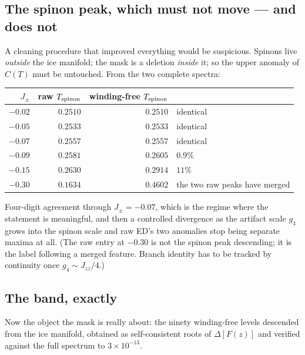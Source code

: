 \documentclass[11pt,a4paper]{article}
\newcommand{\Jpm}{J_{\pm}}
\newcommand{\Jzz}{J_{zz}}
\newcommand{\gfour}{g_4}
\begin{document}
\subsection{The spinon peak, which must not move --- and does not}

A cleaning procedure that improved everything would be suspicious.  Spinons
live \emph{outside} the ice manifold; the mask is a deletion \emph{inside}
it; so the upper anomaly of $C(T)$ must be untouched.  From the two complete
spectra:

\begin{center}
\small
\begin{tabular}{rrrl}
\toprule
$\Jpm$ & raw $T_{\rm spinon}$ & winding-free $T_{\rm spinon}$ & \\
\midrule
$-0.02$ & $0.2510$ & $0.2510$ & identical\\
$-0.05$ & $0.2533$ & $0.2533$ & identical\\
$-0.07$ & $0.2557$ & $0.2557$ & identical\\
$-0.09$ & $0.2581$ & $0.2605$ & $0.9\%$\\
$-0.15$ & $0.2630$ & $0.2914$ & $11\%$\\
$-0.30$ & $0.1634$ & $0.4602$ & the two raw peaks have merged\\
\bottomrule
\end{tabular}
\end{center}

Four-digit agreement through $\Jpm=-0.07$, which is the regime where the
statement is meaningful, and then a controlled divergence as the artifact
scale $\gfour$ grows into the spinon scale and raw ED's two anomalies stop
being separate maxima at all.  (The raw entry at $-0.30$ is not the spinon
peak descending; it is the label following a merged feature.  Branch
identity has to be tracked by continuity once $\gfour\sim\Jzz/4$.)

\subsection{The band, exactly}

Now the object the mask is really about: the ninety winding-free levels
descended from the ice manifold, obtained as self-consistent roots of
$\Delta[F(z)]$ and verified against the full spectrum to $3\times10^{-13}$.
\end{document}
